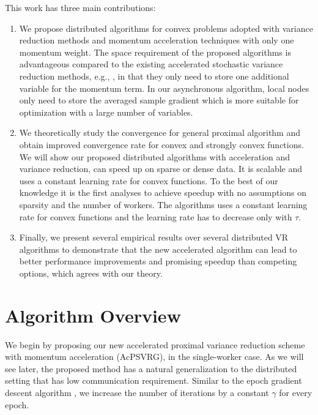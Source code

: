 \documentclass[letterpaper]{article} %
\begin{document}
This work has three main contributions:

\begin{enumerate}
    
\item We propose distributed algorithms for convex problems adopted with variance reduction methods and momentum acceleration techniques with only one momentum weight. The space requirement of the proposed algorithms is advantageous compared to the existing accelerated stochastic variance reduction methods, e.g., \cite{Allen-Zhu17,fang2018accelerating}, in that they only need to store one additional variable for the momentum term. In our asynchronous  algorithm, local nodes only need to store the averaged sample gradient which is more suitable for optimization with a
large number of variables. 

\item We theoretically study the convergence for general proximal algorithm and obtain improved convergence rate for convex and strongly convex functions. We will show our proposed distributed algorithms with acceleration and variance reduction, can speed up on sparse or dense data. It is scalable and uses a constant learning rate for convex functions. To the best of our knowledge it is the first analyses to achieve speedup with no assumptions on sparsity and the number of workers. The algorithms uses a constant learning rate for convex functions and the learning rate has to decrease only with $\tau$. 
 
\item Finally, we present several empirical results over several distributed VR algorithms to demonstrate that the new accelerated algorithm 
can lead to better performance improvements and promising speedup than competing options, which agrees with our theory. 
\end{enumerate}

\section{{Algorithm Overview}}

We begin by proposing our new accelerated proximal variance reduction scheme with momentum acceleration (AcPSVRG), in the single-worker case. 
As we will see later, the proposed method has a natural generalization to the distributed setting that has low communication requirement. Similar to the epoch gradient descent algorithm \cite{Hazan2011}, we increase the number of iterations by a constant $\gamma$ for every epoch. 
\end{document}
